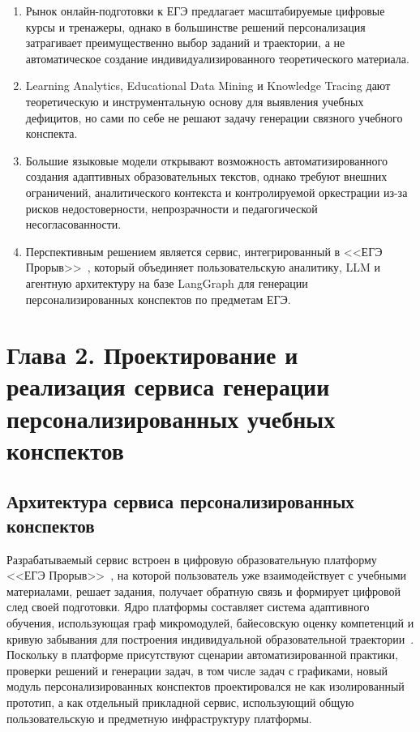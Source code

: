 \documentclass[a4paper,12pt]{extarticle}
\begin{document}
\begin{enumerate}
    \item Рынок онлайн-подготовки к ЕГЭ предлагает масштабируемые цифровые курсы и тренажеры, однако в большинстве 
	решений персонализация затрагивает преимущественно выбор заданий и траектории, а не автоматическое создание 
	индивидуализированного теоретического материала.
    \item Learning Analytics, Educational Data Mining и Knowledge Tracing дают теоретическую и инструментальную 
	основу для выявления учебных дефицитов, но сами по себе не решают задачу генерации связного учебного конспекта.
    \item Большие языковые модели открывают возможность автоматизированного создания адаптивных образовательных текстов, 
	однако требуют внешних ограничений, аналитического контекста и контролируемой оркестрации из-за рисков 
	недостоверности, непрозрачности и педагогической несогласованности.
    \item Перспективным решением является сервис, интегрированный в <<ЕГЭ Прорыв>>~\cite{exambreakout2026}, 
	который объединяет пользовательскую аналитику, LLM и агентную архитектуру на базе LangGraph для 
	генерации персонализированных конспектов по предметам ЕГЭ.
\end{enumerate}
\pagebreak


\section{
    Глава 2. Проектирование и реализация сервиса генерации
    персонализированных учебных конспектов
}

\subsection{Архитектура сервиса персонализированных конспектов}

Разрабатываемый сервис встроен в цифровую образовательную платформу <<ЕГЭ Прорыв>>~\cite{exambreakout2026}, 
на которой пользователь уже взаимодействует 
с учебными материалами, решает задания, получает обратную связь и формирует 
цифровой след своей подготовки. Ядро платформы составляет система адаптивного обучения,
использующая граф микромодулей, байесовскую оценку компетенций и кривую 
забывания для построения индивидуальной образовательной 
траектории~\cite{tarasov2025adaptive,agarev2025trajectories}.
Поскольку в платформе присутствуют сценарии 
автоматизированной практики, проверки решений и генерации задач, в том числе задач 
с графиками, новый модуль персонализированных конспектов проектировался не как 
изолированный прототип, а как отдельный прикладной сервис, использующий общую 
пользовательскую и предметную инфраструктуру платформы.
\end{document}
